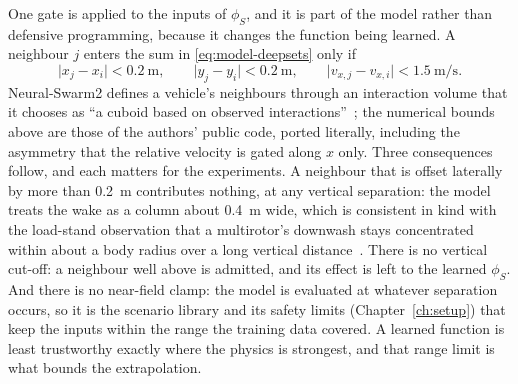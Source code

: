 One gate is applied to the inputs of $\phi_S$, and it is part of the model rather than defensive
programming, because it changes the function being learned. A neighbour $j$ enters the sum in
\eqref{eq:model-deepsets} only if
%
\begin{equation*}
  \lvert x_j - x_i \rvert < \SI{0.2}{\metre}, \qquad
  \lvert y_j - y_i \rvert < \SI{0.2}{\metre}, \qquad
  \lvert v_{x,j} - v_{x,i} \rvert < \SI{1.5}{\metre\per\second}.
\end{equation*}
%
Neural-Swarm2 defines a vehicle's neighbours through an interaction volume that it chooses as ``a
cuboid based on observed interactions''~\cite{shi2022neuralswarm2}; the numerical bounds above are
those of the authors' public code, ported literally, including the asymmetry that the relative
velocity is gated along $x$ only. Three consequences follow, and each matters for the experiments.
A neighbour that is offset laterally by more than \SI{0.2}{\metre} contributes nothing, at any
vertical separation: the model treats the wake as a column about \SI{0.4}{\metre} wide, which is
consistent in kind with the load-stand observation that a multirotor's downwash stays concentrated
within about a body radius over a long vertical distance~\cite{gielis2023aggregate}.
There is no vertical cut-off: a neighbour well above is admitted, and its effect is left to the
learned $\phi_S$. And there is no near-field clamp: the model is evaluated at whatever separation
occurs, so it is the scenario library and its safety limits (Chapter~\ref{ch:setup}) that keep the
inputs within the range the training data covered. A learned function is least trustworthy exactly
where the physics is strongest, and that range limit is what bounds the extrapolation.

